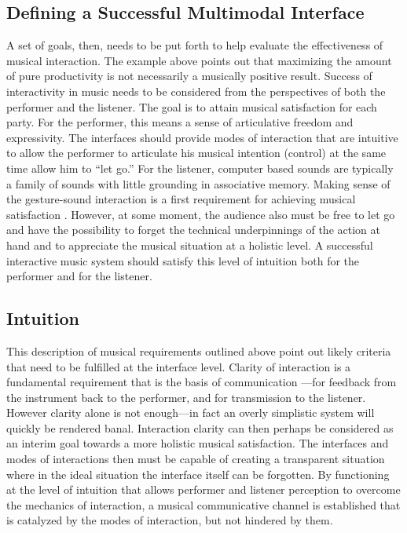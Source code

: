\subsection{Defining a Successful Multimodal Interface}


A set of goals, then, needs to be put forth to help evaluate the effectiveness of musical interaction. The example above points out that maximizing the amount of pure productivity is not necessarily a musically positive result. Success of interactivity in music needs to be considered from the perspectives of both the performer and the listener. The goal is to attain musical satisfaction for each party. For the performer, this means a sense of articulative freedom and expressivity. The interfaces should provide modes of interaction that are intuitive to allow the performer to articulate his musical intention (control) at the same time allow him to ``let go.'' For the listener, computer based sounds are typically a family of sounds with little grounding in associative memory. Making sense of the gesture-sound interaction is a first requirement for achieving musical satisfaction \cite{Tanaka:2000}. However, at some moment, the audience also must be free to let go and have the possibility to forget the technical underpinnings of the action at hand and to appreciate the musical situation at a holistic level. A successful interactive music system should satisfy this level of intuition both for the performer and for the listener.

\subsection{Intuition}


This description of musical requirements outlined above point out likely criteria that need to be fulfilled at the interface level. Clarity of interaction is a fundamental requirement that is the basis of communication \cite{Tanaka:2000}---for feedback from the instrument back to the performer, and for transmission to the listener. However clarity alone is not enough---in fact an overly simplistic system will quickly be rendered banal. Interaction clarity can then perhaps be considered as an interim goal towards a more holistic musical satisfaction. The interfaces and modes of interactions then must be capable of creating a transparent situation where in the ideal situation the interface itself can be forgotten. By functioning at the level of intuition that allows performer and listener perception to overcome the mechanics of interaction, a musical communicative channel is established that is catalyzed by the modes of interaction, but not hindered by them.

